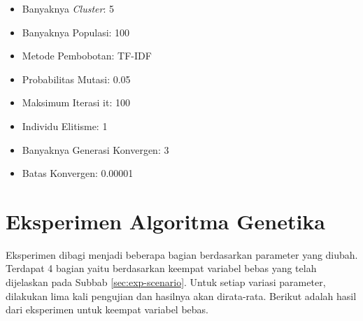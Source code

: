 \begin{itemize}
    \item Banyaknya \textit{Cluster}: 5
    \item Banyaknya Populasi: 100
    \item Metode Pembobotan: TF-IDF
    \item Probabilitas Mutasi: 0.05
    \item Maksimum Iterasi it: 100
    \item Individu Elitisme: 1
    \item Banyaknya Generasi Konvergen: 3
	\item Batas Konvergen: 0.00001
\end{itemize}

\section{Eksperimen Algoritma Genetika}
\label{sec:experiment-ga}
Eksperimen dibagi menjadi beberapa bagian berdasarkan parameter yang diubah. Terdapat 4 bagian yaitu berdasarkan keempat variabel bebas yang telah dijelaskan pada Subbab \ref{sec:exp-scenario}. Untuk setiap variasi parameter, dilakukan lima kali pengujian dan hasilnya akan dirata-rata. Berikut adalah hasil dari eksperimen untuk keempat variabel bebas.

